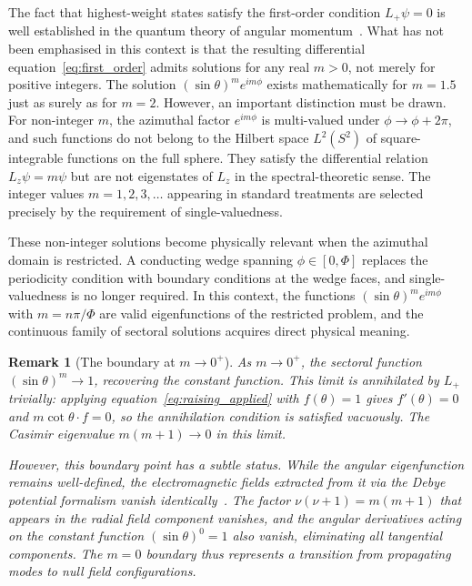 \documentclass[
  aip,
  amsmath,amssymb,
  preprint
]{revtex4-1}
\newtheorem{remark}{Remark}[section]
\begin{document}
The fact that highest-weight states satisfy the first-order condition $L_+ \psi = 0$ is well established in the quantum theory of angular momentum~\cite{Sakurai2017}. What has not been emphasised in this context is that the resulting differential equation~\eqref{eq:first_order} admits solutions for any real $m > 0$, not merely for positive integers. The solution $(\sin\theta)^m e^{im\phi}$ exists mathematically for $m = 1.5$ just as surely as for $m = 2$. However, an important distinction must be drawn. For non-integer $m$, the azimuthal factor $e^{im\phi}$ is multi-valued under $\phi \to \phi + 2\pi$, and such functions do not belong to the Hilbert space $L^2(S^2)$ of square-integrable functions on the full sphere. They satisfy the differential relation $L_z \psi = m\psi$ but are not eigenstates of $L_z$ in the spectral-theoretic sense. The integer values $m = 1, 2, 3, \ldots$ appearing in standard treatments are selected precisely by the requirement of single-valuedness.

These non-integer solutions become physically relevant when the azimuthal domain is restricted. A conducting wedge spanning $\phi \in [0, \Phi]$ replaces the periodicity condition with boundary conditions at the wedge faces, and single-valuedness is no longer required. In this context, the functions $(\sin\theta)^m e^{im\phi}$ with $m = n\pi/\Phi$ are valid eigenfunctions of the restricted problem, and the continuous family of sectoral solutions acquires direct physical meaning.

\begin{remark}[The boundary at $m \to 0^+$]
\label{rem:m_zero}
As $m \to 0^+$, the sectoral function $(\sin\theta)^m \to 1$, recovering the  constant function. This limit is annihilated by $L_+$ trivially: applying equation~\eqref{eq:raising_applied} with $f(\theta) = 1$ gives $f'(\theta) = 0$ and $m\cot\theta \cdot f = 0$, so the annihilation condition is satisfied vacuously. The Casimir eigenvalue $m(m+1) \to 0$ in this limit. 

However, this boundary point has a subtle status. While the angular eigenfunction remains well-defined, the electromagnetic fields extracted from it via the Debye potential formalism vanish identically~\cite{BakrAmari2025}. The factor $\nu(\nu+1) = m(m+1)$ that appears in the radial field component vanishes, and the angular derivatives acting on the constant function $(\sin\theta)^0 = 1$ also vanish, eliminating all tangential components. The $m = 0$ boundary thus represents a transition from propagating modes to null field configurations.
\end{remark}
\end{document}
